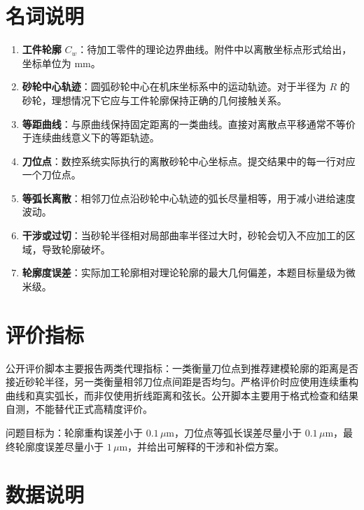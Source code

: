 \documentclass[UTF8,a4paper,11pt]{ctexart}
\begin{document}
\section*{名词说明}

\begin{enumerate}
  \item \textbf{工件轮廓} $C_w$：待加工零件的理论边界曲线。附件中以离散坐标点形式给出，坐标单位为 mm。
  \item \textbf{砂轮中心轨迹}：圆弧砂轮中心在机床坐标系中的运动轨迹。对于半径为 $R$ 的砂轮，理想情况下它应与工件轮廓保持正确的几何接触关系。
  \item \textbf{等距曲线}：与原曲线保持固定距离的一类曲线。直接对离散点平移通常不等价于连续曲线意义下的等距轨迹。
  \item \textbf{刀位点}：数控系统实际执行的离散砂轮中心坐标点。提交结果中的每一行对应一个刀位点。
  \item \textbf{等弧长离散}：相邻刀位点沿砂轮中心轨迹的弧长尽量相等，用于减小进给速度波动。
  \item \textbf{干涉或过切}：当砂轮半径相对局部曲率半径过大时，砂轮会切入不应加工的区域，导致轮廓破坏。
  \item \textbf{轮廓度误差}：实际加工轮廓相对理论轮廓的最大几何偏差，本题目标量级为微米级。
\end{enumerate}

\section*{评价指标}

公开评价脚本主要报告两类代理指标：一类衡量刀位点到推荐建模轮廓的距离是否接近砂轮半径，另一类衡量相邻刀位点间距是否均匀。严格评价时应使用连续重构曲线和真实弧长，而非仅使用折线距离和弦长。公开脚本主要用于格式检查和结果自测，不能替代正式高精度评价。

问题目标为：轮廓重构误差小于 $0.1\,\mu$m，刀位点等弧长误差尽量小于 $0.1\,\mu$m，最终轮廓度误差尽量小于 $1\,\mu$m，并给出可解释的干涉和补偿方案。

\section*{数据说明}
\end{document}
